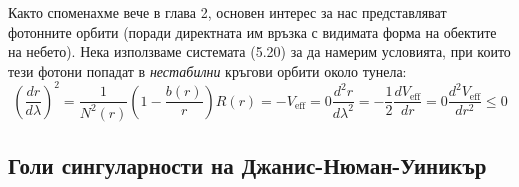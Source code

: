 Както споменахме вече в глава 2, основен интерес за нас представляват фотонните орбити (поради директната им връзка с видимата форма на обектите на небето). Нека използваме системата (5.20) за да намерим условията, при които тези фотони попадат в \emph{нестабилни} кръгови орбити около тунела:
\begin{subequations}
	\begin{equation}
	\left(\frac{dr}{d\lambda}\right)^2 = \frac{1}{N^2(r)}\left(1 - \frac{b(r)}{r}\right)R(r) = - V_\text{eff} = 0
	\end{equation}
	\begin{equation}
		\frac{d^2r}{d\lambda^2} = -\frac{1}{2}\frac{dV_{\text{eff}}}{dr} = 0
	\end{equation}
	\begin{equation}
		\frac{d^2V_\text{eff}}{dr^2} \le 0
	\end{equation}
\end{subequations}

\newpage
\subsection{Голи сингуларности на Джанис-Нюман-Уиникър}
